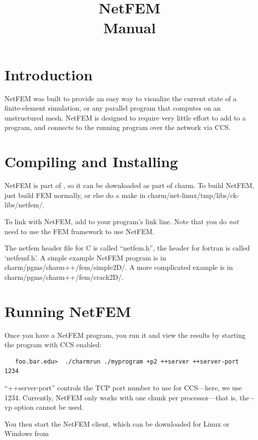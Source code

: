 \documentclass[10pt]{article}
\title{\charmpp\\ NetFEM\\ Manual}
\begin{document}
\maketitle

\section{Introduction}

NetFEM was built to provide an easy way to visualize
the current state of a finite-element simulation, or any 
parallel program that computes on an unstructured mesh.
NetFEM is designed to require very little effort to add
to a program, and connects to the running program over
the network via CCS.


\section{Compiling and Installing}

NetFEM is part of \charmpp{}, so it can be downloaded
as part of charm.  To build NetFEM, just build FEM normally,
or else do a make in charm/net-linux/tmp/libs/ck-libs/netfem/.

To link with NetFEM, add  to your
program's link line.  Note that you do {\em not} need to use
the FEM framework to use NetFEM.

The netfem header file for C is called ``netfem.h'',
the header for fortran is called `netfemf.h'.
A simple example NetFEM program is in 
  charm/pgms/charm++/fem/simple2D/.
A more complicated example is in
  charm/pgms/charm++/fem/crack2D/.


\section{Running NetFEM}

Once you have a NetFEM program, you run it and view 
the results by starting the program with CCS enabled:

\begin{verbatim}
   foo.bar.edu>  ./charmrun ./myprogram +p2 ++server ++server-port 1234
\end{verbatim}

``++server-port'' controls the TCP port number to use for CCS---here,
we use 1234.  Currently, NetFEM only works with one chunk per
processor---that is, the -vp option cannot be used.

You then start the NetFEM client, which can be downloaded
for Linux or Windows from 
\end{document}
